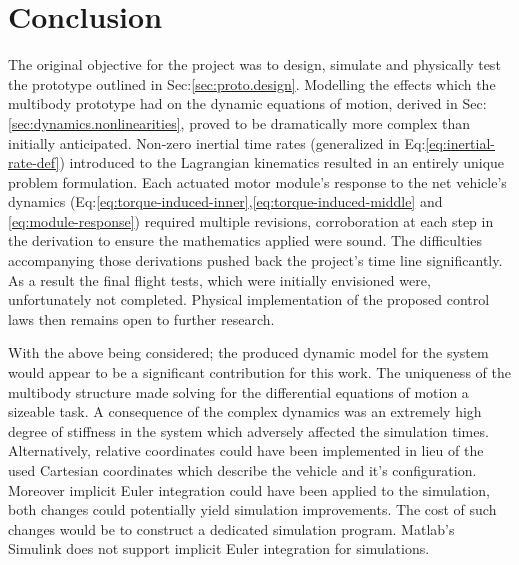 \chapter{Conclusion}
\label{ch:conclusion}
The original objective for the project was to design, simulate and physically test the prototype outlined in Sec:\ref{sec:proto.design}. Modelling the effects which the multibody prototype had on the dynamic equations of motion, derived in Sec:\ref{sec:dynamics.nonlinearities}, proved to be dramatically more complex than initially anticipated. 
Non-zero inertial time rates (generalized in Eq:\ref{eq:inertial-rate-def}) introduced to the Lagrangian kinematics resulted in an entirely unique problem formulation. Each actuated motor module's response to the net vehicle's dynamics (Eq:\ref{eq:torque-induced-inner},\ref{eq:torque-induced-middle} and \ref{eq:module-response}) required multiple revisions, corroboration at each step in the derivation to ensure the mathematics applied were sound. The difficulties accompanying those derivations pushed back the project's time line significantly. As a result the final flight tests, which were initially envisioned were, unfortunately not completed. Physical implementation of the proposed control laws then remains open to further research.
\par
With the above being considered; the produced dynamic model for the system would appear to be a significant contribution for this work. The uniqueness of the multibody structure made solving for the differential equations of motion a sizeable task. A consequence of the complex dynamics was an extremely high degree of stiffness in the system which adversely affected the simulation times. Alternatively, relative coordinates could have been implemented in lieu of the used Cartesian coordinates which describe the vehicle and it's configuration. Moreover implicit Euler integration could have been applied to the simulation, both changes could potentially yield simulation improvements. The cost of such changes would be to construct a dedicated simulation program. Matlab's Simulink does not support implicit Euler integration for simulations.
\par
